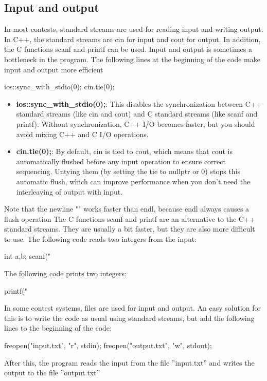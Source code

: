 \documentclass{report}
\begin{document}
    \subsection{Input and output}
    \bigbreak \noindent 
    In most contests, standard streams are used for reading input and writing output. In C++, the standard streams are cin for input and cout for output. In addition, the C functions scanf and printf can be used.
    \bigbreak \noindent 
    Input and output is sometimes a bottleneck in the program. The following lines at the beginning of the code make input and output more efficient
    \bigbreak \noindent 
    \begin{cppcode}
        ios::sync_with_stdio(0);
        cin.tie(0);
    \end{cppcode}
    \begin{itemize}
        \item \textbf{ios::sync\_with\_stdio(0);}: This disables the synchronization between C++ standard streams (like cin and cout) and C standard streams (like scanf and printf). Without synchronization, C++ I/O becomes faster, but you should avoid mixing C++ and C I/O operations.
        \item \textbf{cin.tie(0);}: By default, cin is tied to cout, which means that cout is automatically flushed before any input operation to ensure correct sequencing. Untying them (by setting the tie to nullptr or 0) stops this automatic flush, which can improve performance when you don't need the interleaving of output with input. 
    \end{itemize}
    \bigbreak \noindent 
    Note that the newline "\n" works faster than endl, because endl always causes a flush operation
    \bigbreak \noindent 
    The C functions scanf and printf are an alternative to the C++ standard streams. They are usually a bit faster, but they are also more difficult to use. The following code reads two integers from the input:
    \bigbreak \noindent 
    \begin{cppcode}
    int a,b;
    scanf("%
    \end{cppcode}
    \bigbreak \noindent 
    The following code prints two integers:
    \bigbreak \noindent 
    \begin{cppcode}
        printf("%
    \end{cppcode}
    \bigbreak \noindent 
    In some contest systems, files are used for input and output. An easy solution for this is to write the code as usual using standard streams, but add the following lines to the beginning of the code:
    \bigbreak \noindent 
    \begin{cppcode}
        freopen("input.txt", "r", stdin);
        freopen("output.txt", "w", stdout);
    \end{cppcode}
    \bigbreak \noindent 
    After this, the program reads the input from the file ”input.txt” and writes the output to the file ”output.txt”
\end{document}
